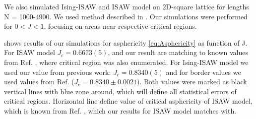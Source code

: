 \documentclass[a4paper]{jpconf}
\begin{document}

We also simulated Ising-ISAW and ISAW model on 2D-square lattice for lengths N = 1000-4900.  
We used method described in \cite{faizullina2021critical}. 
Our simulations were performed for $0 < J < 1$, focusing on areas near respective critical regions.

 shows results of our simulations for asphericity \eqref{eq:Asphericity} as function of J. 
For ISAW model $J_{c} = 0.6673(5)$, and our result are matching to known values from  Ref. \cite{Caracciolo2011}, where critical region was also enumerated.
For Ising-ISAW model we used our value from previous work: $J_{c} = 0.8340(5)$ \cite{faizullina2021critical} and for border values we used values from Ref.\cite{Foster2021} ($J_{c} = 0.8340 \pm 0.0021$). 
Both values were marked as black vertical lines with blue zone around, which will define all statistical errors of critical regions. 
Horizontal line define value of critical asphericity of ISAW model, which is known from Ref. \cite{Caracciolo2011}, which our results for ISAW model matches with.
\end{document}
